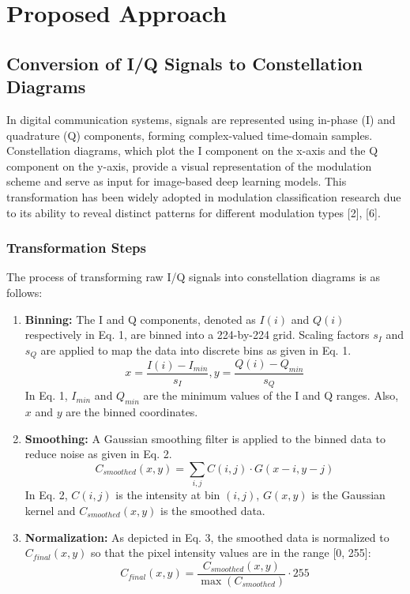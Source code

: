 \documentclass{ELSP}
\begin{document}
\section{Proposed Approach}
\subsection{Conversion of I/Q Signals to Constellation Diagrams}
In digital communication systems, signals are represented using in-phase (I) and quadrature (Q) components, forming complex-valued time-domain samples. Constellation diagrams, which plot the I component on the x-axis and the Q component on the y-axis, provide a visual representation of the modulation scheme and serve as input for image-based deep learning models. This transformation has been widely adopted in modulation classification research due to its ability to reveal distinct patterns for different modulation types [2], [6].

\subsubsection{Transformation Steps}
The process of transforming raw I/Q signals into constellation diagrams is as follows:

\begin{enumerate}[(1)]
    \item \textbf{Binning:} The I and Q components, denoted as $I(i)$ and $Q(i)$ respectively in Eq. 1, are binned into a 224-by-224 grid. Scaling factors $s_I$ and $s_Q$ are applied to map the data into discrete bins as given in Eq. 1.
    \begin{equation}
        x = \frac{I(i) - I_{min}}{s_I}, y = \frac{Q(i) - Q_{min}}{s_Q}
    \end{equation}
    In Eq. 1, $I_{min}$ and $Q_{min}$ are the minimum values of the I and Q ranges. Also, $x$ and $y$ are the binned coordinates.
    
    \item \textbf{Smoothing:} A Gaussian smoothing filter is applied to the binned data to reduce noise as given in Eq. 2.
    \begin{equation}
        C_{smoothed}(x,y) = \sum_{i,j} C(i,j) \cdot G(x-i,y-j)
    \end{equation}
    In Eq. 2, $C(i,j)$ is the intensity at bin $(i,j)$, $G(x,y)$ is the Gaussian kernel and $C_{smoothed}(x,y)$ is the smoothed data.
    
    \item \textbf{Normalization:} As depicted in Eq. 3, the smoothed data is normalized to $C_{final}(x,y)$ so that the pixel intensity values are in the range [0, 255]:
    \begin{equation}
        C_{final}(x,y) = \frac{C_{smoothed}(x,y)}{\max(C_{smoothed})} \cdot 255
    \end{equation}
\end{enumerate}
\end{document}
